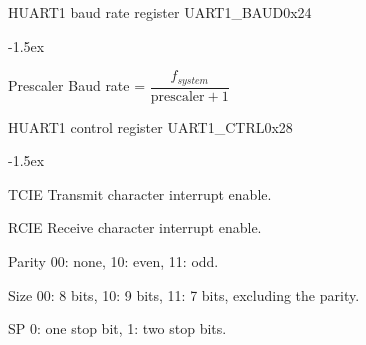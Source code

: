 \documentclass[12pt]{article}
\begin{document}
\begin{register}{H}{UART1 baud rate register UART1\_BAUD}{0x24}
\label{uart1baud}
%
%
\regnewline%
\end{register}
\begin{regdesc}[0.6\textwidth]\begin{reglist}[000000000]
\itemsep-1.5ex
\item[Prescaler] Baud rate = $\dfrac{f_{system}}{\textrm{prescaler}+1}$
\end{reglist}\end{regdesc}

\begin{register}{H}{UART1 control register UART1\_CTRL}{0x28}
\label{uart1ctrl}
%
%
%
%
%
%
\regnewline%
\end{register}
\begin{regdesc}[0.6\textwidth]\begin{reglist}[00000]
\itemsep-1.5ex
\item[TCIE] Transmit character interrupt enable.
\item[RCIE] Receive character interrupt enable.
\item[Parity] 00: none, 10: even, 11: odd.
\item[Size] 00: 8 bits, 10: 9 bits, 11: 7 bits, excluding the parity.
\item[SP] 0: one stop bit, 1: two stop bits.
\end{reglist}\end{regdesc}
\end{document}
